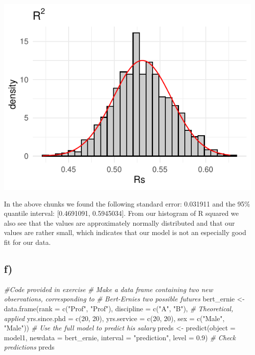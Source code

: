 \documentclass[
]{article}
\newenvironment{Shaded}{\begin{snugshade}}{\end{snugshade}}
\newcommand{\AttributeTok}[1]{\textcolor[rgb]{0.77,0.63,0.00}{#1}}
\newcommand{\CommentTok}[1]{\textcolor[rgb]{0.56,0.35,0.01}{\textit{#1}}}
\newcommand{\DecValTok}[1]{\textcolor[rgb]{0.00,0.00,0.81}{#1}}
\newcommand{\FloatTok}[1]{\textcolor[rgb]{0.00,0.00,0.81}{#1}}
\newcommand{\FunctionTok}[1]{\textcolor[rgb]{0.00,0.00,0.00}{#1}}
\newcommand{\NormalTok}[1]{#1}
\newcommand{\OtherTok}[1]{\textcolor[rgb]{0.56,0.35,0.01}{#1}}
\newcommand{\StringTok}[1]{\textcolor[rgb]{0.31,0.60,0.02}{#1}}
\begin{document}
\begin{center}\includegraphics{Compulsory-1_files/figure-latex/unnamed-chunk-11-1} \end{center}

In the above chunks we found the following standard error: 0.031911 and
the 95\% quantile interval: {[}0.4691091, 0.5945034{]}. From our
histogram of R squared we also see that the values are approximately
normally distributed and that our values are rather small, which
indicates that our model is not an especially good fit for our data.

\hypertarget{f-1}{%
\subsection{f)}\label{f-1}}

\begin{Shaded}
\begin{Highlighting}[]
\CommentTok{\#Code provided in exercise}
\CommentTok{\# Make a data frame containing two new observations, corresponding to}
\CommentTok{\# Bert{-}Ernie\textquotesingle{}s two possible futures}
\NormalTok{bert\_ernie }\OtherTok{\textless{}{-}} \FunctionTok{data.frame}\NormalTok{(}\AttributeTok{rank =} \FunctionTok{c}\NormalTok{(}\StringTok{"Prof"}\NormalTok{, }\StringTok{"Prof"}\NormalTok{),}
\AttributeTok{discipline =} \FunctionTok{c}\NormalTok{(}\StringTok{"A"}\NormalTok{, }\StringTok{"B"}\NormalTok{), }\CommentTok{\# Theoretical, applied}
\AttributeTok{yrs.since.phd =} \FunctionTok{c}\NormalTok{(}\DecValTok{20}\NormalTok{, }\DecValTok{20}\NormalTok{),}
\AttributeTok{yrs.service =} \FunctionTok{c}\NormalTok{(}\DecValTok{20}\NormalTok{, }\DecValTok{20}\NormalTok{),}
\AttributeTok{sex =} \FunctionTok{c}\NormalTok{(}\StringTok{"Male"}\NormalTok{, }\StringTok{"Male"}\NormalTok{))}
\CommentTok{\# Use the full model to predict his salary}
\NormalTok{preds }\OtherTok{\textless{}{-}} \FunctionTok{predict}\NormalTok{(}\AttributeTok{object =}\NormalTok{ model1,}
\AttributeTok{newdata =}\NormalTok{ bert\_ernie,}
\AttributeTok{interval =} \StringTok{"prediction"}\NormalTok{,}
\AttributeTok{level =} \FloatTok{0.9}\NormalTok{) }
\CommentTok{\# Check predictions}
\NormalTok{preds}
\end{Highlighting}
\end{Shaded}
\end{document}
